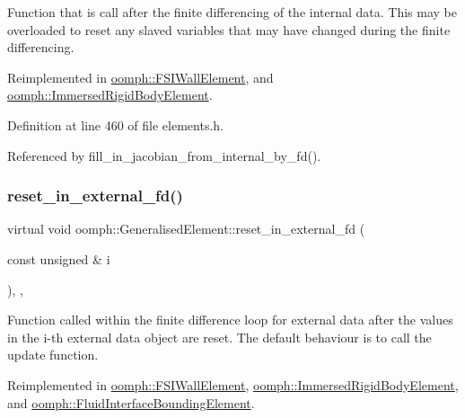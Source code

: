 Function that is call after the finite differencing of the internal data. This may be overloaded to reset any slaved variables that may have changed during the finite differencing. 



Reimplemented in \hyperlink{classoomph_1_1FSIWallElement_ab0229ea34afffcd6d85a10dafa0b7d10}{oomph\+::\+F\+S\+I\+Wall\+Element}, and \hyperlink{classoomph_1_1ImmersedRigidBodyElement_a3fe2dc3e3adbe330de3c7a7a216f49b8}{oomph\+::\+Immersed\+Rigid\+Body\+Element}.



Definition at line 460 of file elements.\+h.



Referenced by fill\+\_\+in\+\_\+jacobian\+\_\+from\+\_\+internal\+\_\+by\+\_\+fd().

\mbox{\label{classoomph_1_1GeneralisedElement_a027a9213e91b946346062adf96e26a85}} 
\subsubsection{\texorpdfstring{reset\+\_\+in\+\_\+external\+\_\+fd()}{reset\_in\_external\_fd()}}
{\footnotesize\ttfamily virtual void oomph\+::\+Generalised\+Element\+::reset\+\_\+in\+\_\+external\+\_\+fd (\begin{DoxyParamCaption}\item[{const unsigned \&}]{i }\end{DoxyParamCaption})\hspace{0.3cm}{\ttfamily [inline]}, {\ttfamily [protected]}, {\ttfamily [virtual]}}



Function called within the finite difference loop for external data after the values in the i-\/th external data object are reset. The default behaviour is to call the update function. 



Reimplemented in \hyperlink{classoomph_1_1FSIWallElement_afbfc79cddd641419f297680674daecfd}{oomph\+::\+F\+S\+I\+Wall\+Element}, \hyperlink{classoomph_1_1ImmersedRigidBodyElement_a54ca1acbe1ad39e6ff692a79062318a0}{oomph\+::\+Immersed\+Rigid\+Body\+Element}, and \hyperlink{classoomph_1_1FluidInterfaceBoundingElement_a7347eb5984a18ffb1cfea1f9240badee}{oomph\+::\+Fluid\+Interface\+Bounding\+Element}.



